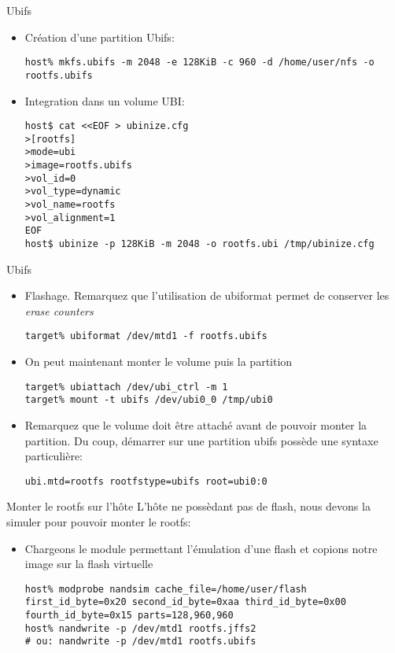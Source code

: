 \begin{frame}[fragile=singleslide]{Ubifs}
  \begin{itemize}
  \item Création d'une partition Ubifs:
    \begin{lstlisting}
host% mkfs.ubifs -m 2048 -e 128KiB -c 960 -d /home/user/nfs -o rootfs.ubifs
     \end{lstlisting}
  \item Integration dans un volume UBI:
    \begin{lstlisting}
host$ cat <<EOF > ubinize.cfg
>[rootfs]
>mode=ubi
>image=rootfs.ubifs
>vol_id=0
>vol_type=dynamic
>vol_name=rootfs
>vol_alignment=1
EOF
host$ ubinize -p 128KiB -m 2048 -o rootfs.ubi /tmp/ubinize.cfg
     \end{lstlisting}
  \end{itemize}
\end{frame}
  
\begin{frame}[fragile=singleslide]{Ubifs}
  \begin{itemize}
  \item Flashage. Remarquez que l'utilisation de ubiformat permet de conserver les \emph{erase counters}
    \begin{lstlisting}
target% ubiformat /dev/mtd1 -f rootfs.ubifs
     \end{lstlisting}
  \item On peut maintenant monter le volume puis la partition
    \begin{lstlisting}
target% ubiattach /dev/ubi_ctrl -m 1
target% mount -t ubifs /dev/ubi0_0 /tmp/ubi0
     \end{lstlisting}
     \item Remarquez que le volume doit être attaché avant de pouvoir monter la partition. Du coup, démarrer sur une partition ubifs possède une syntaxe particulière:
    \begin{lstlisting}
ubi.mtd=rootfs rootfstype=ubifs root=ubi0:0
     \end{lstlisting}
  \end{itemize}
\end{frame}

\begin{frame}[fragile=singleslide]{Monter le rootfs sur l'hôte}
  L'hôte  ne possèdant  pas  de  flash, nous  devons  la simuler  pour
  pouvoir monter le rootfs:
  \begin{itemize}
  \item  Chargeons le  module  permettant l'émulation  d'une flash  et
    copions notre image sur la flash virtuelle
    \begin{lstlisting}
host% modprobe nandsim cache_file=/home/user/flash first_id_byte=0x20 second_id_byte=0xaa third_id_byte=0x00 fourth_id_byte=0x15 parts=128,960,960
host% nandwrite -p /dev/mtd1 rootfs.jffs2
# ou: nandwrite -p /dev/mtd1 rootfs.ubifs
     \end{lstlisting}
  \end{itemize}
\end{frame}
  

